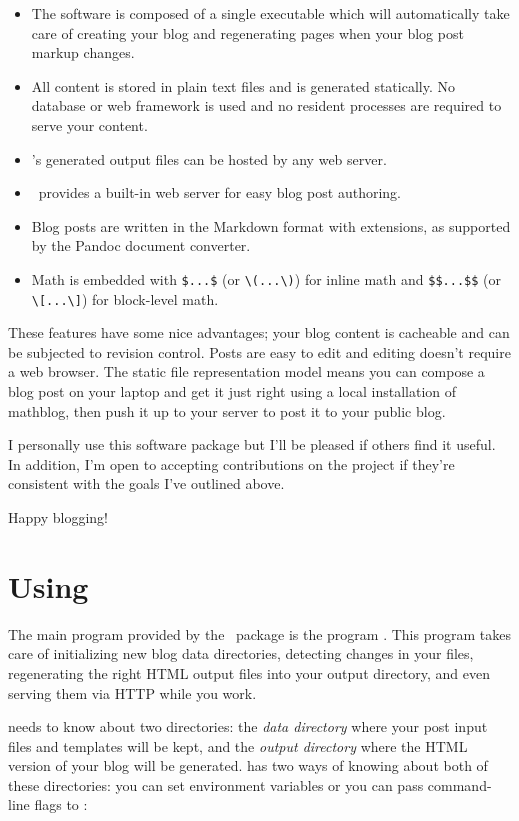 \documentclass[11pt, letterpaper, oneside, titlepage]{book}
\begin{document}
\begin{itemize}
\item{The software is composed of a single executable which will
  automatically take care of creating your blog and regenerating pages
  when your blog post markup changes.}
\item{All content is stored in plain text files and is generated
  statically.  No database or web framework is used and no resident
  processes are required to serve your content.}
\item{\mathblog's generated output files can be hosted by any web
  server.}
\item{\mathblog\ provides a built-in web server for easy blog post
  authoring.}
\item{Blog posts are written in the Markdown format with extensions,
  as supported by the Pandoc document converter.}
\item{Math is embedded with \verb|$...$| (or \verb|\(...\)|) for inline math
	and \verb|$$...$$| (or \verb|\[...\]|) for block-level math.}
\end{itemize}

These features have some nice advantages; your blog content is
cacheable and can be subjected to revision control.  Posts are easy to
edit and editing doesn't require a web browser.  The static file
representation model means you can compose a blog post on your laptop
and get it just right using a local installation of mathblog, then
push it up to your server to post it to your public blog.

I personally use this software package but I'll be pleased if others
find it useful.  In addition, I'm open to accepting contributions on
the project if they're consistent with the goals I've outlined above.

Happy blogging!

\chapter{Using \mathblog}

The main program provided by the \mathblog\ package is the program
.  This program takes care of initializing new blog data
directories, detecting changes in your files, regenerating the right
HTML output files into your output directory, and even serving them
via HTTP while you work.

 needs to know about two directories: the \textit{data
  directory} where your post input files and templates will be kept,
and the \textit{output directory} where the HTML version of your blog
will be generated.   has two ways of knowing about both of
these directories: you can set environment variables or you can pass
command-line flags to :
\end{document}
